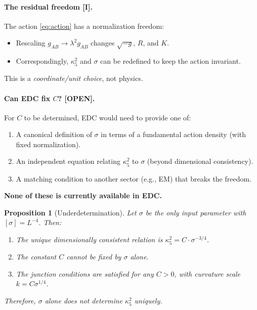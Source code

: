 \documentclass[11pt,a4paper]{article}
\newcommand{\tagI}{\textcolor{green!50!black}{[I]}}
\newcommand{\tagOPEN}{\textcolor{red!70!black}{[OPEN]}}
\newtheorem{proposition}{Proposition}
\begin{document}
\paragraph{The residual freedom \tagI{}.}
The action \eqref{eq:action} has a normalization freedom:
\begin{itemize}[nosep]
    \item Rescaling $g_{AB} \to \lambda^2 g_{AB}$ changes $\sqrt{-g}$, $R$, and $K$.
    \item Correspondingly, $\kappa_5^2$ and $\sigma$ can be redefined to keep the action invariant.
\end{itemize}
This is a \emph{coordinate/unit choice}, not physics.

\paragraph{Can EDC fix $C$? \tagOPEN{}.}
For $C$ to be determined, EDC would need to provide one of:
\begin{enumerate}[nosep]
    \item A canonical definition of $\sigma$ in terms of a fundamental action density (with fixed normalization).
    \item An independent equation relating $\kappa_5^2$ to $\sigma$ (beyond dimensional consistency).
    \item A matching condition to another sector (e.g., EM) that breaks the freedom.
\end{enumerate}
\textbf{None of these is currently available in EDC.}

\begin{nogobox}
\begin{proposition}[Underdetermination]
\label{prop:underdetermination}
Let $\sigma$ be the only input parameter with $[\sigma] = L^{-4}$.
Then:
\begin{enumerate}
    \item The unique dimensionally consistent relation is $\kappa_5^2 = C \cdot \sigma^{-3/4}$.
    \item The constant $C$ cannot be fixed by $\sigma$ alone.
    \item The junction conditions are satisfied for any $C > 0$, with curvature scale $k = C \sigma^{1/4}$.
\end{enumerate}
Therefore, $\sigma$ alone does not determine $\kappa_5^2$ uniquely.
\end{proposition}
\end{nogobox}

\end{document}
